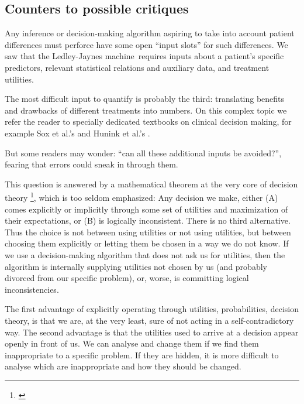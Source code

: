 \documentclass[utf8]{FrontiersinHarvard_mod} %
\newcommand*{\etal}{{et al.}}
\renewcommand*{\|}[1][]{\nonscript\:#1\vert\nonscript\:\mathopen{}}
\newcommand*{\ljm}{Ledley-Jaynes machine}
\begin{document}
\subsection{Counters to possible critiques}
\label{sec:critics}

Any inference or decision-making algorithm aspiring to take into account patient differences must perforce have some open \enquote{input slots} for such differences. We saw that the \ljm\ requires inputs about a patient's specific predictors, relevant statistical relations and auxiliary data, and treatment utilities.

The most difficult input to quantify is probably the third: translating benefits and drawbacks of different treatments into numbers. On this complex topic we refer the reader to specially dedicated textbooks on clinical decision making, for example Sox \etal's \citeyearpar{soxetal1988_r2013} and Hunink \etal's \citeyearpar{huninketal2001_r2014}.


But some readers may wonder: \enquote{can all these additional inputs be avoided?}, fearing that errors could sneak in through them.

This question is answered by a mathematical theorem at the very core of decision theory \footnote{\citet{savage1954_r1972,luceetal1957,raiffaetal1961_r2000,atkinsonetal1964,ferguson1967,lindley1971_r1988,lindley1977,kreps1988,bernardoetal1994_r2000,prattetal1995_r1996,lindley2006_r2014,pettigrew2011_r2019}}, which is too seldom emphasized: Any decision we make, either (A) comes explicitly or implicitly through some set of utilities and maximization of their expectations, or (B) is logically inconsistent. There is no third alternative. Thus the choice is not between using utilities or not using utilities, but between choosing them explicitly or letting them be chosen in a way we do not know. If we use a decision-making algorithm that does not ask us for utilities, then the algorithm is internally supplying utilities not chosen by us (and probably divorced from our specific problem), or, worse, is committing logical inconsistencies.

The first advantage of explicitly operating through utilities, probabilities, decision theory, is that we are, at the very least, sure of not acting in a self-contradictory way. The second advantage is that the utilities used to arrive at a decision appear openly in front of us. We can analyse and change them if we find them inappropriate to a specific problem. If they are hidden, it is more difficult to analyse which are inappropriate and how they should be changed.
\end{document}
